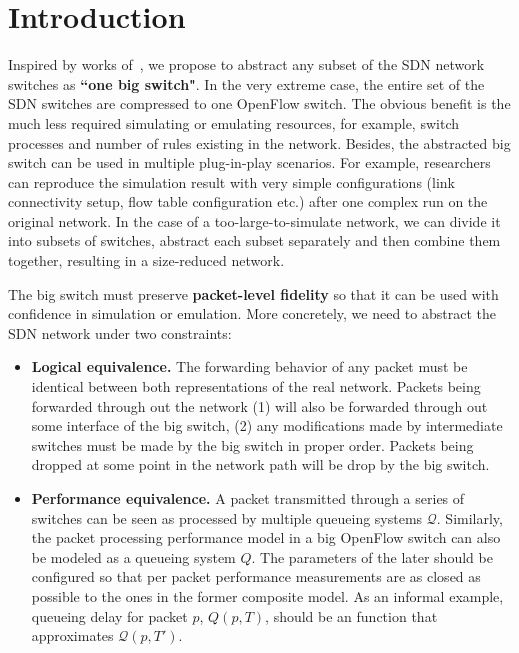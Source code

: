 \section{Introduction}


Inspired by works of~\cite{OneBigSwitchAbstraction, Veriflow},
we propose to abstract any subset of the SDN network switches as \textbf{``one big switch"}.
In the very extreme case, the entire set of the SDN switches are compressed to
one OpenFlow switch.
The obvious benefit is the much less required simulating or emulating resources,
for example, switch processes and number of rules existing in the network.
Besides, the abstracted big switch can be used in multiple plug-in-play scenarios.
For example, researchers can reproduce the simulation result with very
simple configurations (link connectivity setup, flow table configuration etc.)
after one complex run on the original network.
In the case of a too-large-to-simulate network, we can divide it into subsets of switches,
abstract each subset separately and then combine them together, resulting in a
size-reduced network.

The big switch must preserve \textbf{packet-level fidelity} so that
it can be used with confidence in simulation or emulation.
More concretely, we need to abstract the SDN network under two constraints:
\begin{itemize}
\item \textbf{Logical equivalence.} The forwarding behavior of any packet must be identical
        between both representations of the real network. Packets being
        forwarded through out the network (1) will also be forwarded through out
        some interface of the big switch, (2) any modifications made by
        intermediate switches must be made by the big switch in proper order.
        Packets being dropped at some point in the network path will be drop by the
        big switch.
\item \textbf{Performance equivalence.} A packet transmitted through a series of
        switches can be seen as processed by multiple queueing systems $\mathcal{Q}$.
        Similarly, the packet processing performance model in a big OpenFlow switch can
        also be modeled as a queueing system $Q$.
        The parameters of the later should be configured so that per packet performance
        measurements are as closed as possible to the ones in the former composite model.
        As an informal example, queueing delay for packet $p$, $Q(p, T)$, should be an
        function that approximates $\mathcal{Q}(p, T')$.
\end{itemize}

